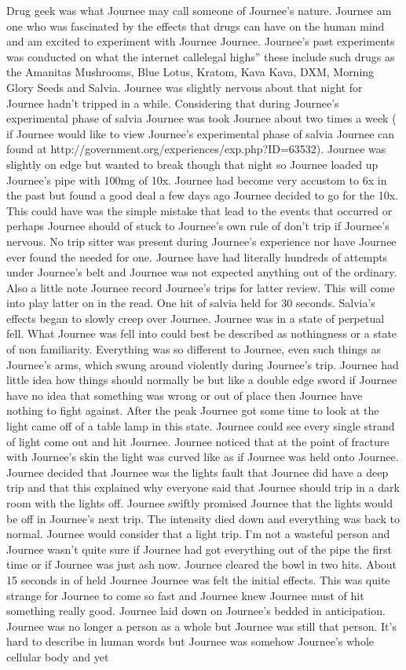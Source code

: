\documentclass[12pt]{book}
\begin{document}
Drug geek was what Journee may call someone of Journee's nature. Journee am one who was fascinated by the effects that drugs can have on the human mind and am excited to experiment with Journee Journee. Journee's past experiments was conducted on what the internet callelegal highs'' these include such drugs as the Amanitas Mushrooms, Blue Lotus, Kratom, Kava Kava, DXM, Morning Glory Seeds and Salvia. Journee was slightly nervous about that night for Journee hadn't tripped in a while. Considering that during Journee's experimental phase of salvia Journee was took Journee about two times a week ( if Journee would like to view Journee's experimental phase of salvia Journee can found at http://government.org/experiences/exp.php?ID=63532). Journee was slightly on edge but wanted to break though that night so Journee loaded up Journee's pipe with 100mg of 10x. Journee had become very accustom to 6x in the past but found a good deal a few days ago Journee decided to go for the 10x. This could have was the simple mistake that lead to the events that occurred or perhaps Journee should of stuck to Journee's own rule of don't trip if Journee's nervous. No trip sitter was present during Journee's experience nor have Journee ever found the needed for one. Journee have had literally hundreds of attempts under Journee's belt and Journee was not expected anything out of the ordinary. Also a little note Journee record Journee's trips for latter review. This will come into play latter on in the read. One hit of salvia held for 30 seconds. Salvia's effects began to slowly creep over Journee. Journee was in a state of perpetual fell. What Journee was fell into could best be described as nothingness or a state of non familiarity. Everything was so different to Journee, even such things as Journee's arms, which swung around violently during Journee's trip. Journee had little idea how things should normally be but like a double edge sword if Journee have no idea that something was wrong or out of place then Journee have nothing to fight against. After the peak Journee got some time to look at the light came off of a table lamp in this state. Journee could see every single strand of light come out and hit Journee. Journee noticed that at the point of fracture with Journee's skin the light was curved like as if Journee was held onto Journee. Journee decided that Journee was the lights fault that Journee did have a deep trip and that this explained why everyone said that Journee should trip in a dark room with the lights off. Journee swiftly promised Journee that the lights would be off in Journee's next trip. The intensity died down and everything was back to normal. Journee would consider that a light trip. I'm not a wasteful person and Journee wasn't quite sure if Journee had got everything out of the pipe the first time or if Journee was just ash now. Journee cleared the bowl in two hits. About 15 seconds in of held Journee Journee was felt the initial effects. This was quite strange for Journee to come so fast and Journee knew Journee must of hit something really good. Journee laid down on Journee's bedded in anticipation. Journee was no longer a person as a whole but Journee was still that person. It's hard to describe in human words but Journee was somehow Journee's whole cellular body and yet 
\end{document}
